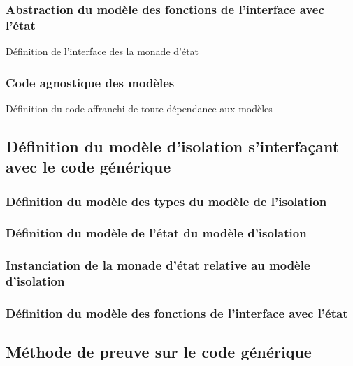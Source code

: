 			\subsubsection{Abstraction du modèle des fonctions de l'interface avec l'état}

			\begin{listing}[!ht]
				\caption{Définition de l'interface des la monade d'état}
				\label{code:InterfaceParameters}
			\end{listing}

			\subsubsection{Code agnostique des modèles}

			\begin{listing}[!ht]
				\caption{Définition du code affranchi de toute dépendance aux modèles}
				\label{code:ModelAgnosticCode}
			\end{listing}

		\subsection{Définition du modèle d'isolation s'interfaçant avec le code générique}
			\subsubsection{Définition du modèle des types du modèle de l'isolation}

			\subsubsection{Définition du modèle de l'état du modèle d'isolation}

			\subsubsection{Instanciation de la monade d'état relative au modèle d'isolation}

			\subsubsection{Définition du modèle des fonctions de l'interface avec l'état}

		\subsection{Méthode de preuve sur le code générique}

